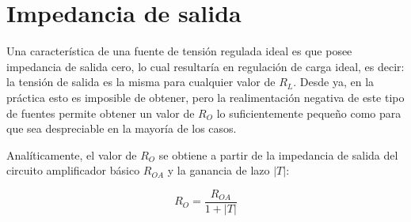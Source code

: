 \documentclass[e2_tp1_main.tex]{subfiles}
\begin{document}
\section{Impedancia de salida}

Una caracter\'istica de una fuente de tensi\'on regulada ideal es que posee impedancia de salida cero, lo cual resultar\'ia en regulaci\'on de carga ideal, es decir: la tensi\'on de salida es la misma para cualquier valor de $R_L$. Desde ya, en la pr\'actica esto es imposible de obtener, pero la realimentaci\'on negativa de este tipo de fuentes permite obtener un valor de $R_O$ lo suficientemente peque\~no como para que sea despreciable en la mayor\'ia de los casos. 

Anal\'iticamente, el valor de $R_O$ se obtiene a partir de la impedancia de salida del circuito amplificador b\'asico $R_{OA}$ y la ganancia de lazo $|T|$:

\begin{equation}
	R_O = \frac{R_{OA}}{1+|T|}
	\label{eq:rout}
\end{equation}
\end{document}
